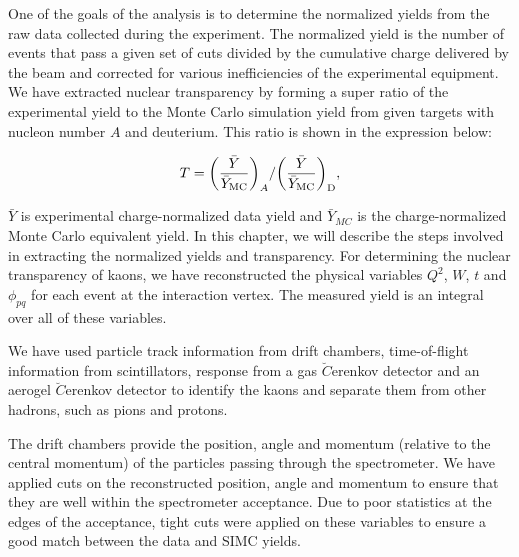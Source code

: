 %
%
%
One of the goals of the analysis is to determine the normalized yields from the raw data collected during the experiment. The normalized yield is the number of events that pass a given set of cuts divided by the cumulative charge delivered by the beam and corrected for various inefficiencies of the experimental equipment. We have extracted nuclear transparency by forming a super ratio of the experimental yield to the Monte Carlo simulation yield from given targets with nucleon number $A$ and deuterium. This ratio is shown in the expression below:

\begin{equation} \label{equ:nucltransp}
T = 
{\left( \frac{\bar Y}{\bar Y_{\rm MC}} \right)_A}/
{\left( \frac{\bar Y}{\bar Y_{\rm MC}} \right)_{\rm D}},
\end{equation}


$\bar{Y}$ is experimental charge-normalized data yield and $\bar{Y}_{MC}$ is the charge-normalized Monte Carlo equivalent yield. In this chapter, we will describe the steps involved in extracting the normalized yields and transparency. For determining the nuclear transparency of kaons, we have reconstructed the physical variables $Q^2$, $W$, $t$ and $\phi_{pq}$ for each event at the interaction vertex.
The measured yield is an integral over all of these variables.

%
%
\label{Particle Identification(PID)}
We have used particle track information from drift chambers, time-of-flight information from scintillators, response from a gas $\breve{C}$erenkov detector and an aerogel $\breve{C}$erenkov detector to identify the kaons and separate them from other hadrons, such as pions and protons.

%
The drift chambers provide the position, angle and momentum (relative to the central momentum) of the particles passing through the spectrometer. We have applied cuts on the reconstructed position, angle and momentum to ensure that they are well within the spectrometer acceptance. Due to poor statistics at the edges of the acceptance, tight cuts were applied on these variables to ensure a good match between the data and SIMC yields.

